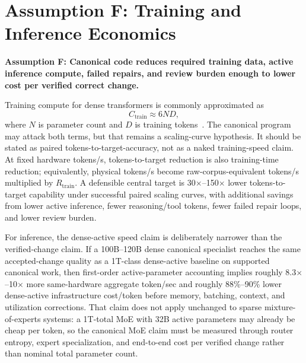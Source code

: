\section{Assumption F: Training and Inference Economics}

\textbf{Assumption F: Canonical code reduces required training data, active inference compute, failed repairs, and review burden enough to lower cost per verified correct change.}

Training compute for dense transformers is commonly approximated as
\begin{equation}
  C_{\text{train}} \approx 6ND,
\end{equation}
where $N$ is parameter count and $D$ is training tokens~\cite{kaplanScaling,hoffmannChinchilla}. The canonical program may attack both terms, but that remains a scaling-curve hypothesis. It should be stated as paired tokens-to-target-accuracy, not as a naked training-speed claim. At fixed hardware tokens/s, tokens-to-target reduction is also training-time reduction; equivalently, physical tokens/s become raw-corpus-equivalent tokens/s multiplied by $R_{\text{train}}$. A defensible central target is 30$\times$--150$\times$ lower tokens-to-target capability under successful paired scaling curves, with additional savings from lower active inference, fewer reasoning/tool tokens, fewer failed repair loops, and lower review burden.

For inference, the dense-active speed claim is deliberately narrower than the verified-change claim. If a 100B--120B dense canonical specialist reaches the same accepted-change quality as a 1T-class dense-active baseline on supported canonical work, then first-order active-parameter accounting implies roughly 8.3$\times$--10$\times$ more same-hardware aggregate token/sec and roughly 88\%--90\% lower dense-active infrastructure cost/token before memory, batching, context, and utilization corrections. That claim does not apply unchanged to sparse mixture-of-experts systems: a 1T-total MoE with 32B active parameters may already be cheap per token, so the canonical MoE claim must be measured through router entropy, expert specialization, and end-to-end cost per verified change rather than nominal total parameter count.

